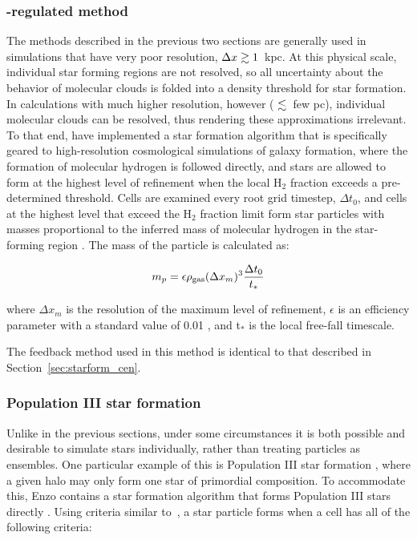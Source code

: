 \subsubsection{\HH-regulated method}
\label{sec:starform_H2reg}

The methods described in the previous two sections are generally used
in simulations that have very poor resolution, $\Delta x \gtrsim 1$~kpc.
At this physical scale, individual star forming regions are not
resolved, so all uncertainty about the behavior of molecular clouds is
folded into a density threshold for star formation.  In calculations
with much higher resolution, however ( $\lesssim$~few pc), individual
molecular clouds can be resolved, thus rendering these approximations
irrelevant.  To that end, \citet{2012ApJ...749...36K} have implemented
a star formation algorithm that is specifically geared to
high-resolution cosmological simulations of galaxy formation, where
the formation of molecular hydrogen is followed directly, and stars
are allowed to form at the highest level of refinement when the local
H$_2$ fraction exceeds a pre-determined threshold.  Cells are examined
every root grid timestep, $\Delta t_0$, and cells at the highest level
that exceed the H$_2$ fraction limit form star particles with masses
proportional to the inferred mass of molecular hydrogen in the
star-forming region
\citep{2008ApJ...689..865K,2009ApJ...693..216K,2010ApJ...709..308M}.
The mass of the particle is calculated as:

\begin{equation} 
m_p = \epsilon \rho_{\rm gas} (\Delta x_{m})^3 \frac{\Delta t_0}{t_*}
\end{equation}

where $\Delta x_{m}$ is the resolution of the maximum level of
refinement, $\epsilon$ is an efficiency parameter with a standard
value of 0.01 \citep[as motivated by][]{2007ApJ...654..304K}, and
t$_*$ is the local free-fall timescale.

The feedback method used in this method is identical to that described
in Section~\ref{sec:starform_cen}.

\subsubsection{Population III star formation}
\label{sec:starform_pop3}

Unlike in the previous sections, under some circumstances it is both
possible and desirable to simulate stars individually, rather than
treating particles as ensembles.  One particular example of this is
Population III star formation
\citep{ABN02,2007ApJ...654...66O,2008ApJ...685...40W,2009Sci...325..601T},
where a given halo may only form one star of primordial composition.
To accommodate this, Enzo contains a star formation algorithm that
forms Population III stars directly \citep{2007ApJ...659L..87A,
  2008ApJ...685...40W, 2012MNRAS.427..311W}.  Using criteria similar
to~\citet{CO1992}, a star particle forms when a cell has all of the
following criteria:

